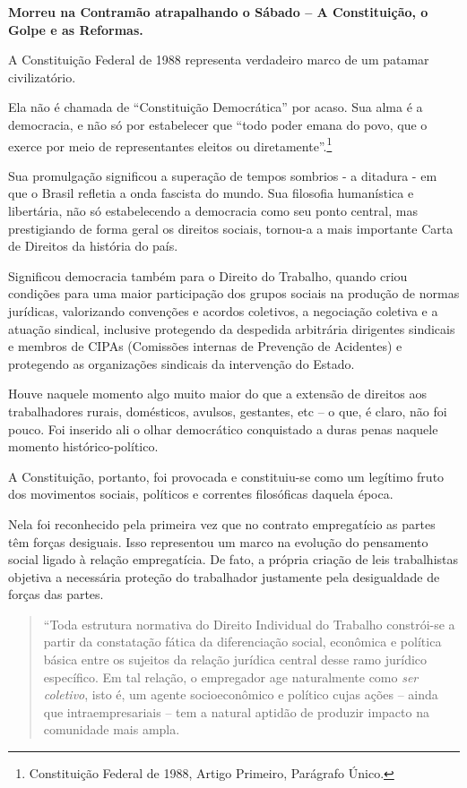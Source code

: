 \textbf{Morreu na Contramão atrapalhando o Sábado -- A Constituição, o
Golpe e as Reformas.}

A Constituição Federal de 1988 representa verdadeiro marco de um patamar
civilizatório.

Ela não é chamada de ``Constituição Democrática'' por acaso. Sua alma é
a democracia, e não só por estabelecer que ``todo poder emana do povo,
que o exerce por meio de representantes eleitos ou
diretamente''.\footnote{Constituição Federal de 1988, Artigo Primeiro,
  Parágrafo Único.}

Sua promulgação significou a superação de tempos sombrios - a ditadura -
em que o Brasil refletia a onda fascista do mundo. Sua filosofia
humanística e libertária, não só estabelecendo a democracia como seu
ponto central, mas prestigiando de forma geral os direitos sociais,
tornou-a a mais importante Carta de Direitos da história do país.

Significou democracia também para o Direito do Trabalho, quando criou
condições para uma maior participação dos grupos sociais na produção de
normas jurídicas, valorizando convenções e acordos coletivos, a
negociação coletiva e a atuação sindical, inclusive protegendo da
despedida arbitrária dirigentes sindicais e membros de CIPAs (Comissões
internas de Prevenção de Acidentes) e protegendo as organizações
sindicais da intervenção do Estado.

Houve naquele momento algo muito maior do que a extensão de direitos aos
trabalhadores rurais, domésticos, avulsos, gestantes, etc -- o que, é
claro, não foi pouco. Foi inserido ali o olhar democrático conquistado a
duras penas naquele momento histórico-político.

A Constituição, portanto, foi provocada e constituiu-se como um legítimo
fruto dos movimentos sociais, políticos e correntes filosóficas daquela
época.

Nela foi reconhecido pela primeira vez que no contrato empregatício as
partes têm forças desiguais. Isso representou um marco na evolução do
pensamento social ligado à relação empregatícia. De fato, a própria
criação de leis trabalhistas objetiva a necessária proteção do
trabalhador justamente pela desigualdade de forças das partes.

\begin{quote}
``Toda estrutura normativa do Direito Individual do Trabalho constrói-se
a partir da constatação fática da diferenciação social, econômica e
política básica entre os sujeitos da relação jurídica central desse ramo
jurídico específico. Em tal relação, o empregador age naturalmente como
\emph{ser coletivo}, isto é, um agente socioeconômico e político cujas
ações -- ainda que intraempresariais -- tem a natural aptidão de
produzir impacto na comunidade mais ampla.
\end{quote}

